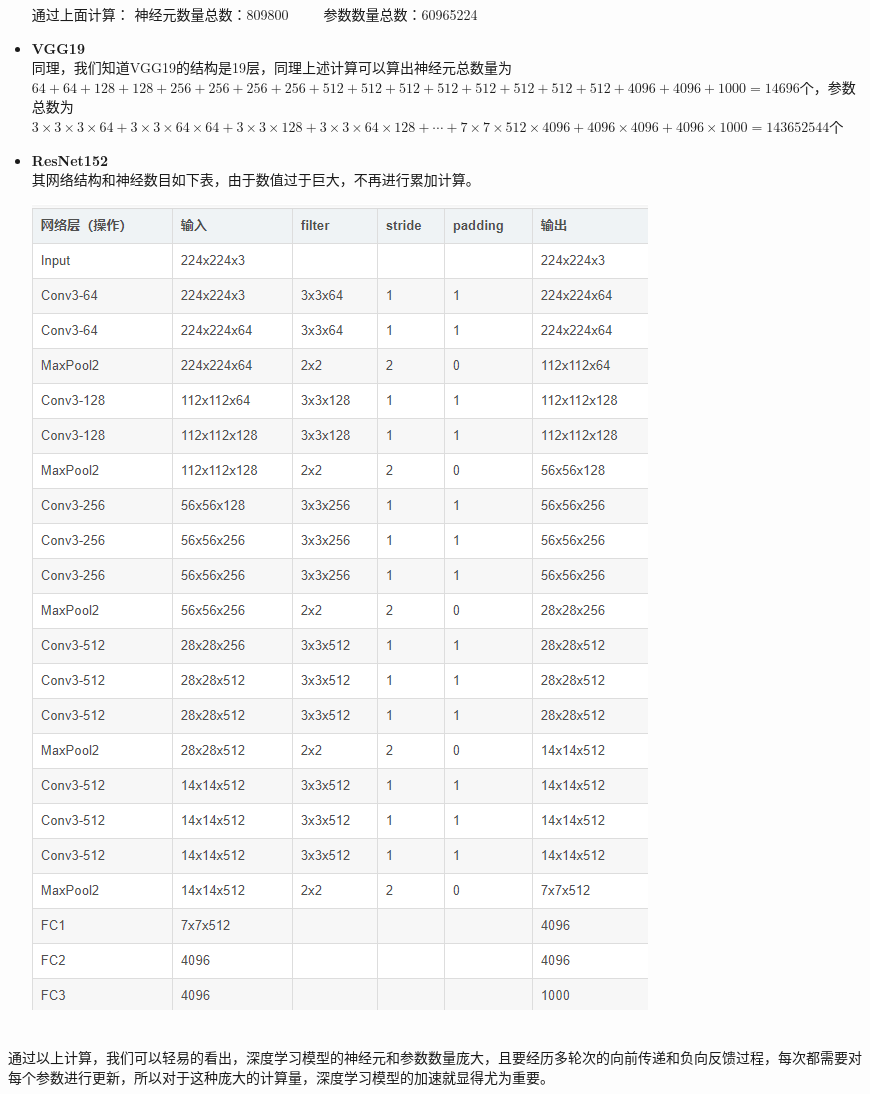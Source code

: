 \documentclass{homework}
\begin{document}
\begin{itemize}
	通过上面计算：
	神经元数量总数：809800\ \ \ \ \  
	参数数量总数：60965224
	\item \textbf{VGG19} \\ 
	同理，我们知道VGG19的结构是19层，同理上述计算可以算出神经元总数量为$64 + 64 + 128 + 128 + 256+256+256+256+512+512+512+512+512+512+512+512+4096+4096+1000 = 14696$个，参数总数为$3 \times 3 \times 3 \times 64 + 3 \times 3\times 64\times 64 +3\times  3\times 128+ 3\times 3\times 64\times 128+\cdots + 7\times 7\times 512 \times 4096+4096\times 4096+4096\times 1000 = 143652544$个
	\item \textbf{ResNet152}\\ 
	其网络结构和神经数目如下表，由于数值过于巨大，不再进行累加计算。
	\begin{center}
		\includegraphics{CoeN3-64.png}
	\end{center}
	
\end{itemize}
~\\
通过以上计算，我们可以轻易的看出，深度学习模型的神经元和参数数量庞大，且要经历多轮次的向前传递和负向反馈过程，每次都需要对每个参数进行更新，所以对于这种庞大的计算量，深度学习模型的加速就显得尤为重要。
\end{document}
